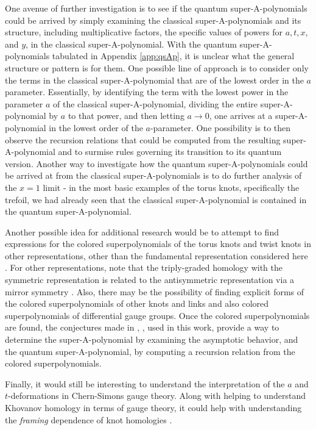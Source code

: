 \documentclass[a4paper,titlepage,twoside]{book}
\begin{document}
One avenue of further investigation is to see if the quantum super-A-polynomials could be arrived by simply examining the classical super-A-polynomials and its structure, including multiplicative factors, the specific values of powers for $a,t,x$, and $y$, in the classical super-A-polynomial.  With the quantum super-A-polynomials tabulated in Appendix \ref{app:qsAp}, it is unclear what the general structure or pattern is for them.  One possible line of approach is to consider only the terms in the classical super-A-polynomial that are of the lowest order in the $a$ parameter.  Essentially, by identifying the term with the lowest power in the parameter $a$ of the classical super-A-polynomial, dividing the entire super-A-polynomial by $a$ to that power, and then letting $a \to 0$, one arrives at a super-A-polynomial in the lowest order of the $a$-parameter.  One possibility is to then observe the recursion relations that could be computed from the resulting super-A-polynomial and to surmise rules governing its transition to its quantum version.  Another way to investigate how the quantum super-A-polynomials could be arrived at from the classical super-A-polynomials is to do further analysis of the $x=1$ limit - in the most basic examples of the torus knots, specifically the trefoil, we had already seen that the classical super-A-polynomial is contained in the quantum super-A-polynomial.  

Another possible idea for additional research would be to attempt to find expressions for the colored superpolynomials of the torus knots and twist knots in other representations, other than the fundamental representation considered here \cite{NRZ2013}.  For other representations, note that the triply-graded homology with the symmetric representation is related to the antisymmetric representation via a mirror symmetry \cite{GukovStosic2012}.  Also, there may be the possibility of finding explicit forms of the colored superpolynomials of other knots and links and also colored superpolynomials of differential gauge groups.  Once the colored superpolynomials are found, the conjectures made in \cite{bib:FGS2012}, \cite{FujiSulkowski2013}, used in this work, provide a way to determine the super-A-polynomial by examining the asymptotic behavior, and the quantum super-A-polynomial, by computing a recursion relation from the colored superpolynomials.  

Finally, it would still be interesting to understand the interpretation of the $a$ and $t$-deformations in Chern-Simons gauge theory.  Along with helping to understand Khovanov homology in terms of gauge theory, it could help with understanding the \emph{framing} dependence of knot homologies \cite{bib:FGS2012}.  
\end{document}
